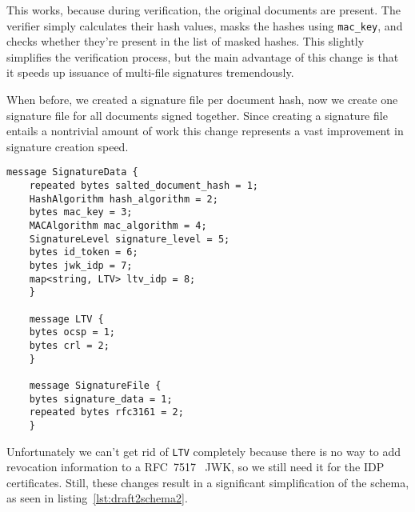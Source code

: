 This works, because during verification, the original documents are present.
The verifier simply calculates their hash values, masks the hashes using \texttt{mac\_key},
and checks whether they're present in the list of masked hashes.
This slightly simplifies the verification process,
but the main advantage of this change is that it speeds up issuance of multi-file signatures tremendously.

When before, we created a signature file per document hash, now we create one signature file for all documents signed together.
Since creating a signature file entails a nontrivial amount of work this change represents a vast improvement in signature creation speed.

\begin{lstlisting}[caption={Simplified schema}, captionpos=b, label={lst:draft2schema2}]
    message SignatureData {
    repeated bytes salted_document_hash = 1;
    HashAlgorithm hash_algorithm = 2;
    bytes mac_key = 3;
    MACAlgorithm mac_algorithm = 4;
    SignatureLevel signature_level = 5;
    bytes id_token = 6;
    bytes jwk_idp = 7;
    map<string, LTV> ltv_idp = 8;
    }

    message LTV {
    bytes ocsp = 1;
    bytes crl = 2;
    }

    message SignatureFile {
    bytes signature_data = 1;
    repeated bytes rfc3161 = 2;
    }
\end{lstlisting}


Unfortunately we can't get rid of \texttt{LTV} completely because there is no way to add revocation information
to a RFC~7517~\cite{rfc7517} JWK, so we still need it for the \gls{IDP} certificates.
Still, these changes result in a significant simplification of the schema, as seen in listing~\ref{lst:draft2schema2}.

